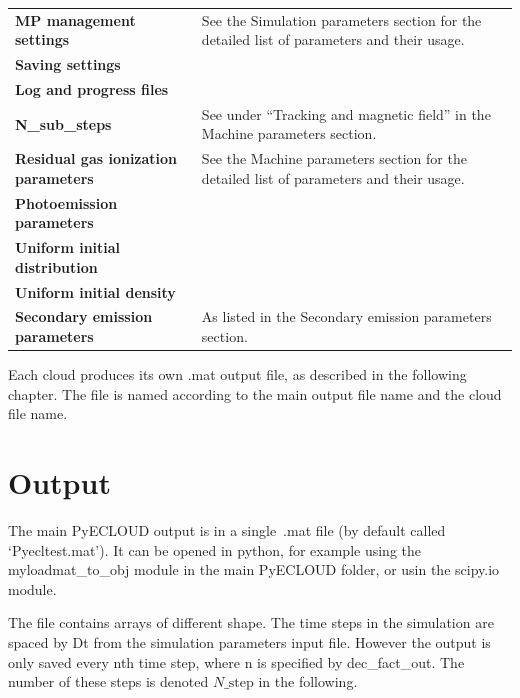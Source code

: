 \documentclass[a4paper,12pt]{article}
\begin{document}
\begin{longtable}{p{}p{}}
\hline\endfirsthead\hline\endhead\rowcolor{Gray}
\multicolumn{2}{p{.97\textwidth}}{
\textbf{Optional cloud parameters}}\\ \hline
\textbf{MP management settings} & See the Simulation parameters section for the detailed list of parameters and their usage.\\
\textbf{Saving settings} &  \\
\textbf{Log and progress files} & \\ \hline
\textbf{N\_sub\_steps} & See under ``Tracking and magnetic field'' in the Machine parameters section.\\ \hline
\textbf{Residual gas ionization parameters} & See the Machine parameters section for the detailed list of parameters and their usage.\\
\textbf{Photoemission parameters} & \\
\textbf{Uniform initial distribution} & \\
\textbf{Uniform initial density} & \\ \hline
\textbf{Secondary emission parameters} & As listed in the Secondary emission parameters section.\\ \hline
\end{longtable}

Each cloud produces its own .mat output file, as described in the following chapter. The file is named according to the main output file name and the cloud file name.

\newpage

\section{Output}
The main PyECLOUD output is in a single~.mat file (by default called `Pyecltest.mat'). It can be opened in python, for example using the myloadmat\_to\_obj module in the main PyECLOUD folder, or usin the scipy.io module.

The file contains arrays of different shape.
The time steps in the simulation are spaced by Dt from the simulation parameters input file.
However the output is only saved every nth time step, where n is specified by dec\_fact\_out.
The number of these steps is denoted $N\_{\mathrm{step}}$ in the following.
\end{document}
